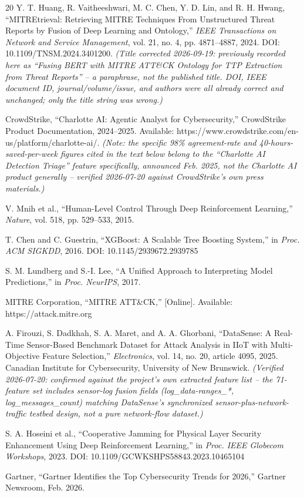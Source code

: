 \documentclass[conference]{IEEEtran}
\begin{document}
\begin{thebibliography}{20}
Y. T. Huang, R. Vaitheeshwari, M. C. Chen, Y. D. Lin, and R. H. Hwang, ``MITREtrieval: Retrieving MITRE Techniques From Unstructured Threat Reports by Fusion of Deep Learning and Ontology,'' \emph{IEEE Transactions on Network and Service Management}, vol. 21, no. 4, pp. 4871--4887, 2024. DOI: 10.1109/TNSM.2024.3401200. \emph{(Title corrected 2026-09-19: previously recorded here as ``Fusing BERT with MITRE ATT\&CK Ontology for TTP Extraction from Threat Reports'' -- a paraphrase, not the published title. DOI, IEEE document ID, journal/volume/issue, and authors were all already correct and unchanged; only the title string was wrong.)}

CrowdStrike, ``Charlotte AI: Agentic Analyst for Cybersecurity,'' CrowdStrike Product Documentation, 2024--2025. Available: https://www.crowdstrike.com/en-us/platform/charlotte-ai/. \emph{(Note: the specific 98\% agreement-rate and 40-hours-saved-per-week figures cited in the text below belong to the ``Charlotte AI Detection Triage'' feature specifically, announced Feb. 2025, not the Charlotte AI product generally -- verified 2026-07-20 against CrowdStrike's own press materials.)}

V. Mnih et al., ``Human-Level Control Through Deep Reinforcement Learning,'' \emph{Nature}, vol. 518, pp. 529--533, 2015.

T. Chen and C. Guestrin, ``XGBoost: A Scalable Tree Boosting System,'' in \emph{Proc. ACM SIGKDD}, 2016. DOI: 10.1145/2939672.2939785

S. M. Lundberg and S.-I. Lee, ``A Unified Approach to Interpreting Model Predictions,'' in \emph{Proc. NeurIPS}, 2017.

MITRE Corporation, ``MITRE ATT\&CK,'' [Online]. Available: https://attack.mitre.org

A. Firouzi, S. Dadkhah, S. A. Maret, and A. A. Ghorbani, ``DataSense: A Real-Time Sensor-Based Benchmark Dataset for Attack Analysis in IIoT with Multi-Objective Feature Selection,'' \emph{Electronics}, vol. 14, no. 20, article 4095, 2025. Canadian Institute for Cybersecurity, University of New Brunswick. \emph{(Verified 2026-07-20: confirmed against the project's own extracted feature list -- the 71-feature set includes sensor-log fusion fields (log\_data-ranges\_*, log\_messages\_count) matching DataSense's synchronized sensor-plus-network-traffic testbed design, not a pure network-flow dataset.)}

S. A. Hoseini et al., ``Cooperative Jamming for Physical Layer Security Enhancement Using Deep Reinforcement Learning,'' in \emph{Proc. IEEE Globecom Workshops}, 2023. DOI: 10.1109/GCWKSHPS58843.2023.10465104

Gartner, ``Gartner Identifies the Top Cybersecurity Trends for 2026,'' Gartner Newsroom, Feb. 2026.

\end{thebibliography}
\end{document}
